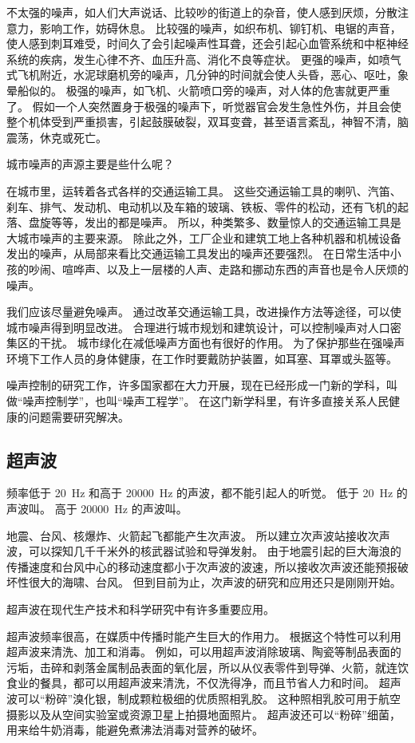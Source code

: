 不太强的噪声，如人们大声说话、比较吵的街道上的杂音，使人感到厌烦，分散注意力，影响工作，妨碍休息。
比较强的噪声，如织布机、铆钉机、电锯的声音，使人感到刺耳难受，时间久了会引起噪声性耳聋，还会引起心血管系统和中枢神经系统的疾病，发生心律不齐、血压升高、消化不良等症状。
更强的噪声，如喷气式飞机附近，水泥球磨机旁的噪声，几分钟的时间就会使人头昏，恶心、呕吐，象晕船似的。
极强的噪声，如飞机、火箭喷口旁的噪声，对人体的危害就更严重了。
假如一个人突然置身于极强的噪声下，听觉器官会发生急性外伤，并且会使整个机体受到严重损害，引起鼓膜破裂，双耳变聋，甚至语言紊乱，神智不清，脑震荡，休克或死亡。

城市噪声的声源主要是些什么呢？

在城市里，运转着各式各样的交通运输工具。
这些交通运输工具的喇叭、汽笛、刹车、排气、发动机、电动机以及车箱的玻璃、铁板、零件的松动，还有飞机的起落、盘旋等等，发出的都是噪声。
所以，种类繁多、数量惊人的交通运输工具是大城市噪声的主要来源。
除此之外，工厂企业和建筑工地上各种机器和机械设备发出的噪声，从局部来看比交通运输工具发出的噪声还要强烈。
在日常生活中小孩的吵闹、喧哗声、以及上一层楼的人声、走路和挪动东西的声音也是令人厌烦的噪声。

我们应该尽量避免噪声。
通过改革交通运输工具，改进操作方法等途径，可以使城市噪声得到明显改进。
合理进行城市规划和建筑设计，可以控制噪声对人口密集区的干扰。
城市绿化在减低噪声方面也有很好的作用。
为了保护那些在强噪声环境下工作人员的身体健康，在工作时要戴防护装置，如耳塞、耳罩或头盔等。

噪声控制的研究工作，许多国家都在大力开展，现在已经形成一门新的学科，叫做“噪声控制学”，也叫“噪声工程学”。
在这门新学科里，有许多直接关系人民健康的问题需要研究解决。

\subsection{超声波}
频率低于 \qty{20}{Hz} 和高于 \qty{20000}{Hz} 的声波，都不能引起人的听觉。
低于 \qty{20}{Hz} 的声波叫。
高于 \qty{20000}{Hz} 的声波叫。

地震、台风、核爆炸、火箭起飞都能产生次声波。
所以建立次声波站接收次声波，可以探知几千千米外的核武器试验和导弹发射。
由于地震引起的巨大海浪的传播速度和台风中心的移动速度都小于次声波的波速，所以接收次声波还能预报破坏性很大的海啸、台风。
但到目前为止，次声波的研究和应用还只是刚刚开始。

超声波在现代生产技术和科学研究中有许多重要应用。

超声波频率很高，在媒质中传播时能产生巨大的作用力。
根据这个特性可以利用超声波来清洗、加工和消毒。
例如，可以用超声波消除玻璃、陶瓷等制品表面的污垢，击碎和剥落金属制品表面的氧化层，所以从仪表零件到导弹、火箭，就连饮食业的餐具，都可以用超声波来清洗，不仅洗得净，而且节省人力和时间。
超声波可以“粉碎”溴化银，制成颗粒极细的优质照相乳胶。
这种照相乳胶可用于航空摄影以及从空间实验室或资源卫星上拍摄地面照片。
超声波还可以“粉碎”细菌，用来给牛奶消毒，能避免煮沸法消毒对营养的破坏。


